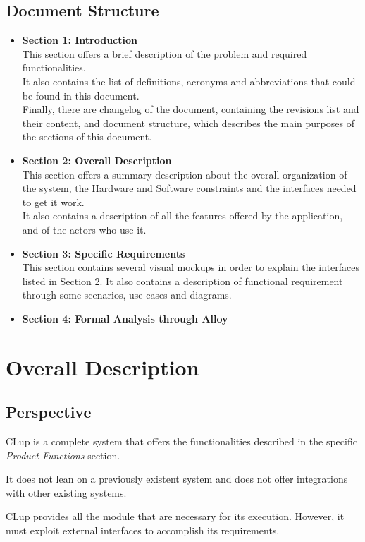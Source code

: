 \documentclass[table, 12pt]{article}
\begin{document}
\subsection{Document Structure}
\begin{itemize}
    \item {\textbf{Section 1: Introduction}\\This section offers a brief description of the problem and required functionalities. \\It also contains the list of definitions, acronyms and abbreviations that could be found in this document. \\Finally, there are changelog of the document, containing the revisions list and their content, and document structure, which describes the main purposes of the sections of this document.}
    \item {\textbf{Section 2: Overall Description}\\This section offers a summary description about the overall organization of the system, the Hardware and Software constraints and the interfaces needed to get it work.\\It also contains a description of all the features offered by the application, and of the actors who use it.}
    \item {\textbf{Section 3: Specific Requirements}\\This section contains several visual mockups in order to explain the interfaces listed in Section 2. It also contains a description of functional requirement through some scenarios, use cases and diagrams.}
    \item {\textbf{Section 4: Formal Analysis through Alloy}}
\end{itemize}
\newpage
\section{Overall Description}
\subsection{Perspective}
CLup is a complete system that offers the functionalities described in the specific \textit{Product Functions} section.

It does not lean on a previously existent system and does not offer integrations with other existing systems.

CLup provides all the module that are necessary for its execution. However, it must exploit external interfaces to accomplish its requirements.
\end{document}
